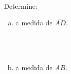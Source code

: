 \documentclass[a4paper,14pt]{article}
\begin{document}
\begin{multicols}{2}
\begin{enumerate}
    			Determine:
    			\begin{enumerate}[a)]
    				\item a medida de $\overline{AD}$. \\\\\\\\
    				\item a medida de $\overline{AB}$. 			
    			\end{enumerate}
    		\end{enumerate}
    		$~$ \\ $~$ \\ $~$
	\end{multicols}
\end{document}
